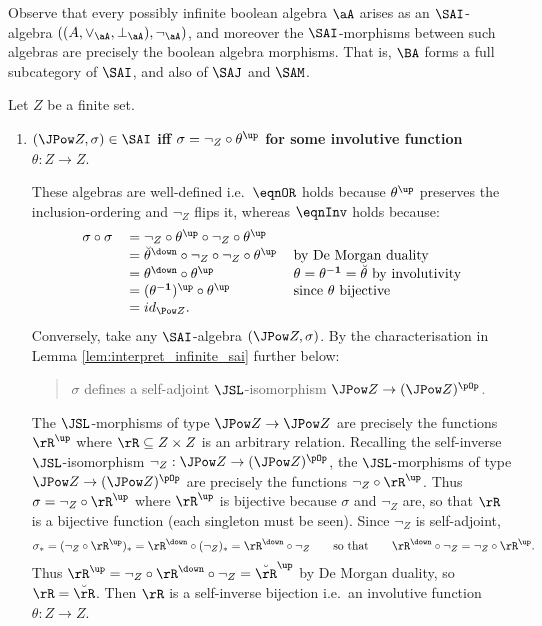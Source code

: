 \documentclass{article}
\begin{document}
\smallskip

\begin{example}
\label{ex:ba_full_subcat_sai}
Observe that every possibly infinite boolean algebra $\aA$ arises as an $\SAI$-algebra $((A,\lor_\aA,\bot_\aA),\neg_\aA)$, and moreover the $\SAI$-morphisms between such algebras are precisely the boolean algebra morphisms. That is, $\BA$ forms a full subcategory of $\SAI$, and also of $\SAJ$ and $\SAM$. \endbox
\end{example}

\smallskip

\begin{example}
  \label{ex:char_sa_jmi_fin_boolean}
  Let $Z$ be a finite set.
  \begin{enumerate}
  \item
  {\bf $(\JPow Z,\sigma) \in \SAI$ iff $\sigma = \neg_Z \circ \theta^\up$ for some involutive function $\theta : Z \to Z$}.
  
  \smallskip
  These algebras are well-defined i.e.\ $\eqnOR$ holds because $\theta^\up$ preserves the inclusion-ordering and $\neg_Z$ flips it, whereas $\eqnInv$ holds because:
  \[
  \begin{tabular}{lll}
  $\sigma \circ \sigma$
  &
  $= \neg_Z \circ \theta^\up \circ \neg_Z \circ \theta^\up$
  \\&
  $= \breve{\theta}^\down \circ \neg_Z \circ \neg_Z \circ \theta^\up$
  & by De Morgan duality
  \\&
  $= \theta^\down \circ \theta^\up$
  & $\theta = \theta^{\bf-1} = \breve{\theta}$ by involutivity
  \\&
  $= (\theta^{\bf-1})^\up \circ \theta^\up$
  & since $\theta$ bijective
  \\&
  $= id_{\Pow Z}$.
  \end{tabular}
  \]
  Conversely, take any $\SAI$-algebra $(\JPow Z,\sigma)$. By the characterisation in Lemma \ref{lem:interpret_infinite_sai} further below:
  \begin{quote}
   $\sigma$ defines a self-adjoint $\JSL$-isomorphism $\JPow Z \to (\JPow Z)^{\pOp}$.
  \end{quote}
   The $\JSL$-morphisms of type $\JPow Z \to \JPow Z$ are precisely the functions $\rR^\up$ where $\rR \subseteq Z \times Z$ is an arbitrary relation. Recalling the self-inverse $\JSL$-isomorphism $\neg_Z : \JPow Z \to (\JPow Z)^{\pOp}$, the $\JSL$-morphisms of type $\JPow Z \to (\JPow Z)^{\pOp}$ are precisely the functions $\neg_Z \circ \rR^\up$. Thus $\sigma = \neg_Z \circ \rR^\up$ where $\rR^\up$ is bijective because $\sigma$ and $\neg_Z$ are, so that $\rR$ is a bijective function (each singleton must be seen). Since $\neg_Z$ is self-adjoint,
  \[
  \sigma_*
  = (\neg_Z \circ \rR^\up)_*
  = \rR^\down \circ (\neg_Z)_*
  = \rR^\down \circ \neg_Z
  \qquad\text{so that}\qquad
  \rR^\down \circ \neg_Z = \neg_Z \circ \rR^\up.
  \]
  Thus $\rR^\up = \neg_Z \circ \rR^\down \circ \neg_Z = \breve{\rR}^\up$ by De Morgan duality, so $\rR = \breve{\rR}$. Then $\rR$ is a self-inverse bijection i.e.\ an involutive function $\theta : Z \to Z$.
  

\end{enumerate}
\end{example}
\end{document}
